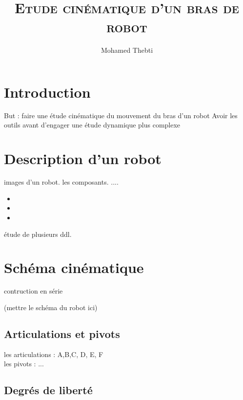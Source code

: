 \documentclass[12pt,a4paper]{article}
\title{
	\Huge\textsc{Etude cinématique d'un bras de robot}
}
\author{Mohamed Thebti}
\begin{document}
\setlength{\parindent}{0mm}

\fancyhead[R]{\slshape \leftmark}

\fancyfoot[C]{}
\fancyfoot[R]{\thepage}

\maketitle
\newpage

\tableofcontents

\newpage



\section{Introduction}

But : faire une étude cinématique du mouvement du bras d'un robot
\medbreak
Avoir les outils avant d'engager une étude dynamique plus complexe 

\newpage
\section{Description d'un robot}
images d'un robot. les composants. ....
\begin{itemize}
	\item 
	\item 
	\item 
\end{itemize}

étude de plusieurs ddl.
\newpage
\section{Schéma cinématique}
contruction en série 

(mettre le schéma du robot ici)
\subsection{Articulations et pivots}
les articulations : A,B,C, D, E, F\\
les pivots : ...\\
\subsection{Degrés de liberté}
\end{document}
